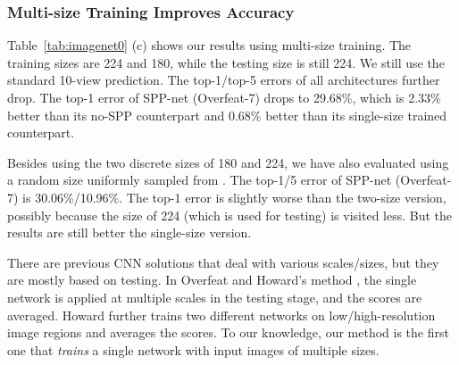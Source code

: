 \documentclass[10pt,journal,cspaper,compsoc]{IEEEtran}
\begin{document}
\subsubsection{Multi-size Training Improves Accuracy}

Table~\ref{tab:imagenet0} (c) shows our results using multi-size training. The training sizes are 224 and 180, while the testing size is still 224. We still use the standard 10-view prediction. The top-1/top-5 errors of all architectures further drop. The top-1 error of SPP-net (Overfeat-7) drops to 29.68\%, which is 2.33\% better than its no-SPP counterpart and 0.68\% better than its single-size trained counterpart.

Besides using the two discrete sizes of 180 and 224, we have also evaluated using a random size uniformly sampled from . The top-1/5 error of SPP-net (Overfeat-7) is 30.06\%/10.96\%. The top-1 error is slightly worse than the two-size version, possibly because the size of 224 (which is used for testing) is visited less.
But the results are still better the single-size version.

There are previous CNN solutions \cite{Sermanet2013,Howard2013} that deal with various scales/sizes,
but they are mostly based on testing.
In Overfeat \cite{Sermanet2013} and Howard's method \cite{Howard2013}, the single network is applied at multiple scales in the testing stage, and the scores are averaged. Howard further trains two different networks on low/high-resolution image regions and averages the scores. To our knowledge, our method is the first one that \emph{trains} a single network with input images of multiple sizes.
\end{document}
